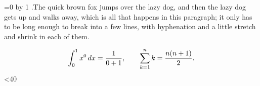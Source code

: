 \pdftrailerid{}
\def\sample#1{\noindent #1.\enspace The quick brown fox jumps over the lazy dog, and then the lazy dog gets up and walks away,
  which is all that happens in this paragraph; it only has to be long enough to break into a few lines, with hyphenation and
  a little stretch and shrink in each of them.\par}
=0
\loop\advance{} by 1
  \sample{\number\count1}
  $$\int_0^1 x^{\number\count1}\,dx={1\over\number\count1+1},\qquad \sum_{k=1}^n k={n(n+1)\over2}.$$
  \medskip
\ifnum{}<40 \repeat
{}
\bye
